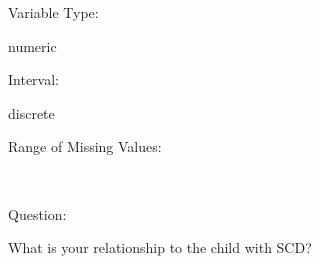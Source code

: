 \documentclass[
]{article}
\begin{document}
\begin{minipage}[t]{0.3\linewidth}

Variable Type:

\end{minipage}%
\begin{minipage}[t]{0.7\linewidth}

numeric

\end{minipage}

\begin{minipage}[t]{0.3\linewidth}

Interval:

\end{minipage}%
\begin{minipage}[t]{0.7\linewidth}

discrete

\end{minipage}

\begin{minipage}[t]{0.3\linewidth}

Range of Missing Values:

\end{minipage}%
\begin{minipage}[t]{0.7\linewidth}

~

\end{minipage}

\begin{minipage}[t]{0.3\linewidth}

Question:

\end{minipage}%
\begin{minipage}[t]{0.7\linewidth}

What is your relationship to the child with SCD?

\end{minipage}
\end{document}
